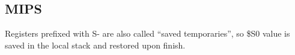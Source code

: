 \ifx\RUSSIAN\undefined
\subsection{MIPS}



Registers prefixed with S- are also called ``saved temporaries'', so \$S0 value is saved in the local stack
and restored upon finish.

\fi
